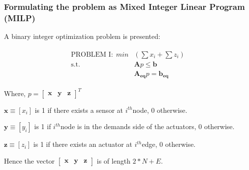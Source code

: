 \documentclass[authoryear,preprint,review,12pt]{elsarticle}
\begin{document}
\subsubsection{Formulating the problem as  Mixed Integer Linear Program (MILP)}
A binary integer optimization problem is presented:

\begin{eqnarray}
\begin{aligned}
\text{PROBLEM I:}~~ min & (\sum x_{i}+\sum z_{i})\\
\text{s.t.}~& \mathbf{A}
p
 \leq \mathbf{b}\\
& \mathbf{A_{eq}}p =  \mathbf{b_{eq}}
\end{aligned}
\end{eqnarray}



Where, $  p=\begin{bmatrix}
 \mathbf{x} & \mathbf{y} & \mathbf{z} \end{bmatrix}^{T}$

$\mathbf{x}\equiv[x_{i}]$ is 1 if there exists a sensor at
$i^{th}$node, 0 otherwise.

$\mathbf{y}\equiv[y_{i}]$ is 1 if $i^{th}$node is in the demands
side of the actuators, 0 otherwise.

$\mathbf{z}\equiv[z_{i}]$ is 1 if there exists an actuator at $i^{th}$edge,
0 otherwise.

Hence the vector $\left[\mathbf{\begin{array}{ccc}
\mathbf{x} & \mathbf{y} & \mathbf{z}\end{array}}\right]$ is of length $2*N+E$.
\end{document}
